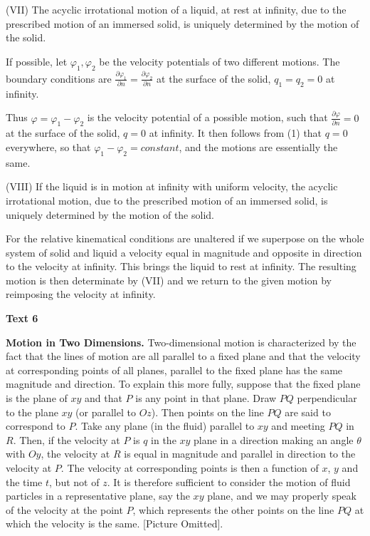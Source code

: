 \documentclass[a4paper]{article}
\newcommand{\ESect}[1]{\medskip\par{\large \textbf{#1}}\par}
\begin{document}
(VII) The acyclic irrotational motion of a liquid, at rest at infinity, due to the prescribed motion of an immersed solid,
is uniquely determined by the motion of the solid.

If possible, let $\varphi_1, \varphi_2$ be the velocity potentials of two different motions. The boundary conditions are
$\frac{\partial \varphi_1}{\partial n} = \frac{\partial \varphi_2}{\partial n}$ at the surface of the solid, $q_1=q_2 = 0$
at infinity.

Thus $\varphi=\varphi_1-\varphi_2$ is the velocity potential of a possible motion, such that $\frac{\partial \varphi}{\partial n} = 0$
 at the surface of the solid, $q = 0$ at infinity. It then follows from (1) that $q = 0$ everywhere, so that
 $\varphi_1-\varphi_2 = constant$, and the motions are essentially the same.

(VIII) If the liquid is in motion at infinity with uniform velocity, the acyclic irrotational motion, due to the prescribed
motion of an immersed solid, is uniquely determined by the motion of the solid.

For the relative kinematical conditions are unaltered if we superpose on the whole system of solid and liquid a velocity
equal in magnitude and opposite in direction to the velocity at infinity. This brings the liquid to rest at infinity.
The resulting motion is then determinate by (VII) and we return to the given motion by reimposing the velocity at infinity.

\ESect{Text 6}
\textbf{Motion in Two Dimensions.} Two-dimensional motion is characterized by the fact that the lines of motion are all
parallel to a fixed plane and that the velocity at corresponding points of all planes, parallel to the fixed plane has the
same magnitude and direction. To explain this more fully, suppose that the fixed plane is the plane of $xy$ and that $P$ is
any point in that plane. Draw $PQ$ perpendicular to the plane $xy$ (or parallel to $Oz$). Then points on the line $PQ$ are
said to correspond to $P$. Take any plane (in the fluid) parallel to $xy$ and meeting $PQ$ in $R$. Then, if the velocity
at $P$ is $q$ in the $xy$ plane in a direction making an angle $\theta$ with $Oy$, the velocity at $R$ is equal in magnitude
and parallel in direction to the velocity at $P$. The velocity at corresponding points is then a function of $x$, $y$ and the
time $t$, but not of $z$. It is therefore sufficient to consider the motion of fluid particles in a representative plane, say
the $xy$ plane, and we may properly speak of the velocity at the point $P$, which represents the other points on the line $PQ$
at which the velocity is the same. [Picture Omitted].
\end{document}
